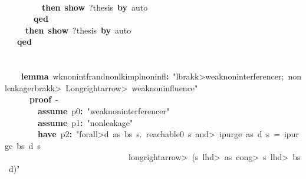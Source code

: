 \documentclass{article}
\newcommand{\syntaxKEYWORDA}[1]{\textcolor[rgb]{0.0,0.4,0.6}{\textbf{#1}}}
\newcommand{\syntaxKEYWORDC}[1]{\textcolor[rgb]{0.0,0.6,1.0}{\textbf{#1}}}
\newcommand{\syntaxLITERALA}[1]{\textcolor[rgb]{1.0,0.0,0.8}{#1}}
\newcommand{\syntaxOPERATOR}[1]{\textcolor[rgb]{0.0,0.0,0.0}{\textbf{#1}}}
\newcommand{\syntaxKEYWORDA}[1]{\textcolor[rgb]{0.0,0.4,0.6}{\textbf{#1}}}
\newcommand{\syntaxKEYWORDC}[1]{\textcolor[rgb]{0.0,0.6,1.0}{\textbf{#1}}}
\newcommand{\syntaxLITERALA}[1]{\textcolor[rgb]{1.0,0.0,0.8}{#1}}
\newcommand{\syntaxOPERATOR}[1]{\textcolor[rgb]{0.0,0.0,0.0}{\textbf{#1}}}
\newcommand{\syntaxKEYWORDA}[1]{\textcolor[rgb]{0.0,0.4,0.6}{\textbf{#1}}}
\newcommand{\syntaxKEYWORDC}[1]{\textcolor[rgb]{0.0,0.6,1.0}{\textbf{#1}}}
\newcommand{\syntaxLITERALA}[1]{\textcolor[rgb]{1.0,0.0,0.8}{#1}}
\newcommand{\syntaxOPERATOR}[1]{\textcolor[rgb]{0.0,0.0,0.0}{\textbf{#1}}}
\newcommand{\syntaxKEYWORDA}[1]{\textcolor[rgb]{0.0,0.4,0.6}{#1}}
\newcommand{\syntaxKEYWORDC}[1]{\textcolor[rgb]{0.0,0.6,1.0}{#1}}
\newcommand{\syntaxLITERALA}[1]{\textcolor[rgb]{1.0,0.0,0.8}{\textbf{#1}}}
\newcommand{\syntaxOPERATOR}[1]{\textcolor[rgb]{0.0,0.0,0.0}{#1}}
\newcommand{\syntaxKEYWORDA}[1]{\textcolor[rgb]{0.0,0.4,0.6}{\textbf{#1}}}
\newcommand{\syntaxKEYWORDC}[1]{\textcolor[rgb]{0.0,0.6,1.0}{\textbf{#1}}}
\newcommand{\syntaxLITERALA}[1]{\textcolor[rgb]{1.0,0.0,0.8}{#1}}
\newcommand{\syntaxOPERATOR}[1]{\textcolor[rgb]{0.0,0.0,0.0}{\textbf{#1}}}
\newcommand{\syntaxKEYWORDA}[1]{\textcolor[rgb]{0.0,0.4,0.6}{\textbf{#1}}}
\newcommand{\syntaxKEYWORDC}[1]{\textcolor[rgb]{0.0,0.6,1.0}{\textbf{#1}}}
\newcommand{\syntaxLITERALA}[1]{\textcolor[rgb]{1.0,0.0,0.8}{#1}}
\newcommand{\syntaxOPERATOR}[1]{\textcolor[rgb]{0.0,0.0,0.0}{\textbf{#1}}}
\begin{document}
{\ }{\ }{\ }{\ }{\ }{\ }{\ }{\ }{\ }\syntaxKEYWORDA{\usebox{\closecurlybracket}}\hspace*{\fill}\\
{\ }{\ }{\ }{\ }{\ }{\ }{\ }{\ }{\ }\syntaxKEYWORDA{then}{\ }\syntaxKEYWORDC{show}{\ }?thesis{\ }\syntaxKEYWORDA{by}{\ }auto\hspace*{\fill}\\
{\ }{\ }{\ }{\ }{\ }{\ }{\ }\syntaxKEYWORDA{qed}\hspace*{\fill}\\
{\ }{\ }{\ }{\ }{\ }\syntaxKEYWORDA{then}{\ }\syntaxKEYWORDC{show}{\ }?thesis{\ }\syntaxKEYWORDA{by}{\ }auto\hspace*{\fill}\\
{\ }{\ }{\ }\syntaxKEYWORDA{qed}\hspace*{\fill}\\
\hspace*{\fill}\\
{\ }{\ }{\ }{\ }\hspace*{\fill}\\
{\ }{\ }{\ }{\ }\syntaxKEYWORDA{lemma}{\ }wk\usebox{\underscorebox}nonintf\usebox{\underscorebox}r\usebox{\underscorebox}and\usebox{\underscorebox}nonlk\usebox{\underscorebox}impl\usebox{\underscorebox}noninfl\syntaxOPERATOR{:}{\ }\syntaxLITERALA{"\<lbrakk>weak\usebox{\underscorebox}noninterference\usebox{\underscorebox}r;{\ }nonleakage\<rbrakk>{\ }\<Longrightarrow>{\ }weak\usebox{\underscorebox}noninfluence"}\hspace*{\fill}\\
{\ }{\ }{\ }{\ }{\ }{\ }\syntaxKEYWORDA{proof}{\ }{-}\hspace*{\fill}\\
{\ }{\ }{\ }{\ }{\ }{\ }{\ }{\ }\syntaxKEYWORDC{assume}{\ }p0\syntaxOPERATOR{:}{\ }\syntaxLITERALA{"weak\usebox{\underscorebox}noninterference\usebox{\underscorebox}r"}\hspace*{\fill}\\
{\ }{\ }{\ }{\ }{\ }{\ }{\ }{\ }\syntaxKEYWORDC{assume}{\ }p1\syntaxOPERATOR{:}{\ }\syntaxLITERALA{"nonleakage"}\hspace*{\fill}\\
{\ }{\ }{\ }{\ }{\ }{\ }{\ }{\ }\syntaxKEYWORDA{have}{\ }p2\syntaxOPERATOR{:}{\ }\syntaxLITERALA{"\<forall>d{\ }as{\ }bs{\ }s.{\ }reachable0{\ }s{\ }\<and>{\ }ipurge{\ }as{\ }d{\ }s{\ }={\ }ipurge{\ }bs{\ }d{\ }s}\hspace*{\fill}\\
\syntaxLITERALA{{\ }{\ }{\ }{\ }{\ }{\ }{\ }{\ }{\ }{\ }{\ }{\ }{\ }{\ }{\ }{\ }{\ }{\ }{\ }{\ }{\ }{\ }{\ }{\ }{\ }{\ }{\ }{\ }{\ }{\ }\<longrightarrow>{\ }(s{\ }\<lhd>{\ }as{\ }\<cong>{\ }s{\ }\<lhd>{\ }bs{\ }\usebox{\atbox}{\ }d)"}\hspace*{\fill}\\
\end{document}
